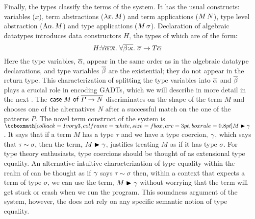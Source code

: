 \documentclass[screen,nonacm]{acmart}
\begin{document}
Finally, the types classify the terms of the system. It has the usual constructs: variables ($x$), term abstractions ($\lambda x.\, M$) and term applications ($M \, N$), type level abstraction ($\Lambda \alpha.\, M$) and type applications ($M\,\sigma$). Declaration of algebraic datatypes introduces data constructors $H$, the types of which are of the form:
$$
H {:} \forall\overline{\alpha{:}\kappa}.~\forall\overline{\beta{:}\kappa}.~\overline{\sigma} \to T \overline{\alpha}
$$
Here the type variables, $\overline{\alpha}$, appear in the same order as in the algebraic datatype declarations, and type variables $\overline{\beta}$ are the existential; they do not appear in the return type. This characterization of splitting the type variables into $\overline{\alpha}$ and $\overline{\beta}$ plays a crucial role in encoding GADTs, which we will describe in more detail in the next . The $\mathsf{case}\;M\;\mathsf{of}\;\overline{P \to N}$ discriminates on the shape of the term $M$ and chooses one of the alternatives $N$ after a successful match on the one of the patterns $P$. The novel term construct of the system is $\shl{\Cast {M} \Co}$. It says that if a term $M$ has a type $\tau$ and we have a type coercion, $\gamma$, which says that $\tau\sim\sigma$, then the term, $M\mathrel{\blacktriangleright}\gamma$, justifies treating $M$ as if it has type $\sigma$. For type theory enthusiasts, type coercions should be thought of as extensional type equality. An alternative intuitive characterization of type equality within the realm of \SFC can be thought as if $\gamma$ says $\tau \sim \sigma$ then, within a context that expects a term of type $\sigma$, we can use the term, $M\mathrel{\blacktriangleright}\gamma$ without worrying that the term will get stuck or crash when we run the program.  This soundness argument of the system, however, the does not rely on any specific semantic notion of type equality.%
\end{document}
